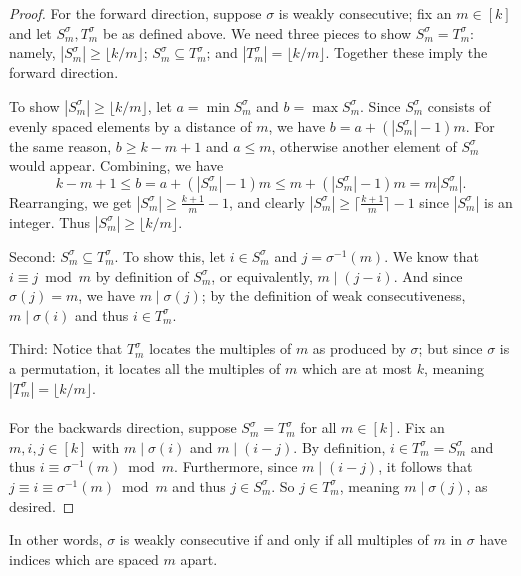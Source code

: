 \documentclass{article}
\theoremstyle{definition}
\theoremstyle{remark}
\numberwithin{equation}{section}
\numberwithin{case}{theorem}
\begin{document}
\begin{proof}
    For the forward direction, suppose $\sigma$ is weakly consecutive; fix an $m \in [k]$ and let $S_m^\sigma, T_m^\sigma$ be as defined above. We need three pieces to show $S_m^\sigma = T_m^\sigma$: namely, $|S_m^\sigma| \geq \lfloor k/m \rfloor$; $S_m^\sigma \subseteq T_m^\sigma$; and $|T_m^\sigma| = \lfloor k/m \rfloor$. Together these imply the forward direction.

    To show $|S_m^\sigma| \geq \lfloor k/m \rfloor$, let $a = \min S_m^\sigma$ and $b = \max S_m^\sigma$. Since $S_m^\sigma$ consists of evenly spaced elements by a distance of $m$, we have $b = a + (|S_m^\sigma| - 1)m$. For the same reason, $b \geq k-m+1$ and $a \leq m$, otherwise another element of $S_m^\sigma$ would appear. Combining, we have
    \[
      k - m + 1 \leq b = a + (|S_m^\sigma| - 1)m \leq m + (|S_m^\sigma| - 1) m = m|S_m^\sigma|.
    \]
    Rearranging, we get $|S_m^\sigma| \geq \frac {k+1}{m} - 1$, and clearly $|S_m^\sigma| \geq \lceil \frac{k+1}{m} \rceil - 1$ since $|S_m^\sigma|$ is an integer. Thus $|S_m^\sigma| \geq \lfloor k/m \rfloor$. %
    
    Second: $S_m^\sigma \subseteq T_m^\sigma$. To show this, let $i \in S_m^\sigma$ and $j = \sigma^{-1}(m)$. We know that $i \equiv j \bmod m$ by definition of $S_m^\sigma$, or equivalently, $m \mid (j-i)$. And since $\sigma(j) = m$, we have $m \mid \sigma(j)$; by the definition of weak consecutiveness, $m \mid \sigma(i)$ and thus $i \in T_m^\sigma$.
    
    Third: Notice that $T_m^\sigma$ locates the multiples of $m$ as produced by $\sigma$; but since $\sigma$ is a permutation, it locates all the multiples of $m$ which are at most $k$, meaning $|T_m^\sigma| = \lfloor k/m \rfloor$.
    \\
    \\
    For the backwards direction, suppose $S_m^\sigma = T_m^\sigma$ for all $m \in [k]$. Fix an $m, i, j \in [k]$ with $m \mid \sigma(i)$ and $m \mid (i-j)$. By definition, $i \in T_m^\sigma = S_m^\sigma$ and thus $i \equiv \sigma^{-1}(m) \bmod m$. Furthermore, since $m \mid (i - j)$, it follows that $j \equiv i \equiv \sigma^{-1}(m) \bmod m$ and thus  $j \in S_m^\sigma$. So $j \in T_m^\sigma$, meaning $m \mid \sigma(j)$, as desired.
\end{proof}

In other words, $\sigma$ is weakly consecutive if and only if all multiples of $m$ in $\sigma$ have indices which are spaced $m$ apart.
\end{document}

